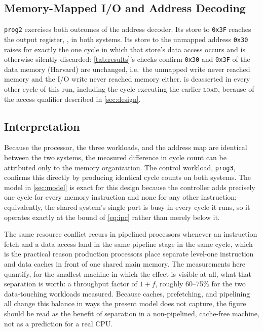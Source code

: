 \documentclass[conference]{IEEEtran}
\newcommand{\sig}[1]{\texttt{\detokenize{#1}}}
\begin{document}
\subsection{Memory-Mapped I/O and Address Decoding}
\texttt{prog2} exercises both outcomes of the address decoder. Its store to \texttt{0x3F} reaches
the output register, \sig{io_out}, in both systems. Its store to the unmapped address \texttt{0x30}
raises \sig{addr_err} for exactly the one cycle in which that store's data access occurs and is
otherwise silently discarded: \cref{tab:results}'s checks confirm \texttt{0x30} and \texttt{0x3F}
of the data memory (Harvard) are unchanged, i.e.\ the unmapped write never reached memory and the
I/O write never reached memory either. \sig{addr_err} is deasserted in every other cycle of this
run, including the cycle executing the earlier \textsc{load}, because of the access qualifier
described in \cref{sec:design}.

\subsection{Interpretation}
Because the processor, the three workloads, and the address map are identical between the two
systems, the measured difference in cycle count can be attributed only to the memory organization.
The control workload, \texttt{prog3}, confirms this directly by producing identical cycle counts on
both systems. The model in \cref{sec:model} is exact for this design because the controller adds
precisely one cycle for every memory instruction and none for any other instruction; equivalently,
the shared system's single port is busy in every cycle it runs, so it operates exactly at the bound
of \cref{eq:ipc} rather than merely below it.

The same resource conflict recurs in pipelined processors whenever an instruction fetch and a data
access land in the same pipeline stage in the same cycle, which is the practical reason production
processors place separate level-one instruction and data caches in front of one shared main memory.
The measurements here quantify, for the smallest machine in which the effect is visible at all, what
that separation is worth: a throughput factor of $1+f$, roughly 60--75\% for the two data-touching
workloads measured. Because caches, prefetching, and pipelining all change this balance in ways the
present model does not capture, the figure should be read as the benefit of separation in a
non-pipelined, cache-free machine, not as a prediction for a real CPU.
\end{document}
